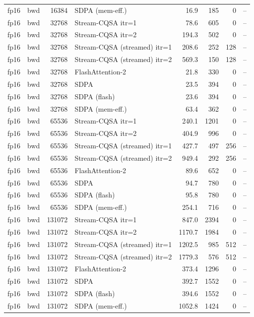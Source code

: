 \begin{tabular}{llrlrrrl}
fp16 & bwd & 16384 & SDPA (mem-eff.) & 16.9 & 185 & 0 & -- \\
fp16 & bwd & 32768 & Stream-CQSA itr=1 & 78.6 & 605 & 0 & -- \\
fp16 & bwd & 32768 & Stream-CQSA itr=2 & 194.3 & 502 & 0 & -- \\
fp16 & bwd & 32768 & Stream-CQSA (streamed) itr=1 & 208.6 & 252 & 128 & -- \\
fp16 & bwd & 32768 & Stream-CQSA (streamed) itr=2 & 569.3 & 150 & 128 & -- \\
fp16 & bwd & 32768 & FlashAttention-2 & 21.8 & 330 & 0 & -- \\
fp16 & bwd & 32768 & SDPA & 23.5 & 394 & 0 & -- \\
fp16 & bwd & 32768 & SDPA (flash) & 23.6 & 394 & 0 & -- \\
fp16 & bwd & 32768 & SDPA (mem-eff.) & 63.4 & 362 & 0 & -- \\
fp16 & bwd & 65536 & Stream-CQSA itr=1 & 240.1 & 1201 & 0 & -- \\
fp16 & bwd & 65536 & Stream-CQSA itr=2 & 404.9 & 996 & 0 & -- \\
fp16 & bwd & 65536 & Stream-CQSA (streamed) itr=1 & 427.7 & 497 & 256 & -- \\
fp16 & bwd & 65536 & Stream-CQSA (streamed) itr=2 & 949.4 & 292 & 256 & -- \\
fp16 & bwd & 65536 & FlashAttention-2 & 89.6 & 652 & 0 & -- \\
fp16 & bwd & 65536 & SDPA & 94.7 & 780 & 0 & -- \\
fp16 & bwd & 65536 & SDPA (flash) & 95.8 & 780 & 0 & -- \\
fp16 & bwd & 65536 & SDPA (mem-eff.) & 254.1 & 716 & 0 & -- \\
fp16 & bwd & 131072 & Stream-CQSA itr=1 & 847.0 & 2394 & 0 & -- \\
fp16 & bwd & 131072 & Stream-CQSA itr=2 & 1170.7 & 1984 & 0 & -- \\
fp16 & bwd & 131072 & Stream-CQSA (streamed) itr=1 & 1202.5 & 985 & 512 & -- \\
fp16 & bwd & 131072 & Stream-CQSA (streamed) itr=2 & 1779.3 & 576 & 512 & -- \\
fp16 & bwd & 131072 & FlashAttention-2 & 373.4 & 1296 & 0 & -- \\
fp16 & bwd & 131072 & SDPA & 392.7 & 1552 & 0 & -- \\
fp16 & bwd & 131072 & SDPA (flash) & 394.6 & 1552 & 0 & -- \\
fp16 & bwd & 131072 & SDPA (mem-eff.) & 1052.8 & 1424 & 0 & -- \\

\end{tabular}
